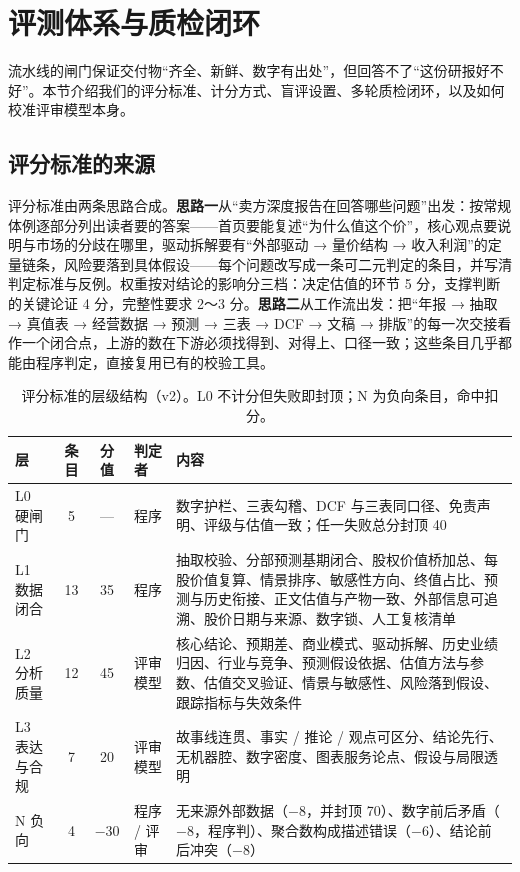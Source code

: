 \section{评测体系与质检闭环}
\label{sec:eval}

流水线的闸门保证交付物“齐全、新鲜、数字有出处”，但回答不了“这份研报好不好”。本节介绍我们的评分标准、计分方式、盲评设置、多轮质检闭环，以及如何校准评审模型本身。

\subsection{评分标准的来源}
评分标准由两条思路合成。\textbf{思路一}从“卖方深度报告在回答哪些问题”出发：按常规体例逐部分列出读者要的答案——首页要能复述“为什么值这个价”，核心观点要说明与市场的分歧在哪里，驱动拆解要有“外部驱动 → 量价结构 → 收入利润”的定量链条，风险要落到具体假设——每个问题改写成一条可二元判定的条目，并写清判定标准与反例。权重按对结论的影响分三档：决定估值的环节 5 分，支撑判断的关键论证 4 分，完整性要求 2～3 分。\textbf{思路二}从工作流出发：把“年报 → 抽取 → 真值表 → 经营数据 → 预测 → 三表 → DCF → 文稿 → 排版”的每一次交接看作一个闭合点，上游的数在下游必须找得到、对得上、口径一致；这些条目几乎都能由程序判定，直接复用已有的校验工具。

\begin{table}[t]
\centering
\caption{评分标准的层级结构（v2）。L0 不计分但失败即封顶；N 为负向条目，命中扣分。}
\label{tab:rubric}
\small
\begin{tabularx}{\linewidth}{@{}p{1.9cm}cc p{1.6cm}X@{}}
\toprule
层 & 条目 & 分值 & 判定者 & 内容 \\
\midrule
L0 硬闸门 & 5 & — & 程序 & 数字护栏、三表勾稽、DCF 与三表同口径、免责声明、评级与估值一致；任一失败总分封顶 40 \\
L1 数据闭合 & 13 & 35 & 程序 & 抽取校验、分部预测基期闭合、股权价值桥加总、每股价值复算、情景排序、敏感性方向、终值占比、预测与历史衔接、正文估值与产物一致、外部信息可追溯、股价日期与来源、数字锁、人工复核清单 \\
L2 分析质量 & 12 & 45 & 评审模型 & 核心结论、预期差、商业模式、驱动拆解、历史业绩归因、行业与竞争、预测假设依据、估值方法与参数、估值交叉验证、情景与敏感性、风险落到假设、跟踪指标与失效条件 \\
L3 表达与合规 & 7 & 20 & 评审模型 & 故事线连贯、事实 / 推论 / 观点可区分、结论先行、无机器腔、数字密度、图表服务论点、假设与局限透明 \\
N 负向 & 4 & $-30$ & 程序 / 评审 & 无来源外部数据（$-8$，并封顶 70）、数字前后矛盾（$-8$，程序判）、聚合数构成描述错误（$-6$）、结论前后冲突（$-8$） \\
\bottomrule
\end{tabularx}
\end{table}

